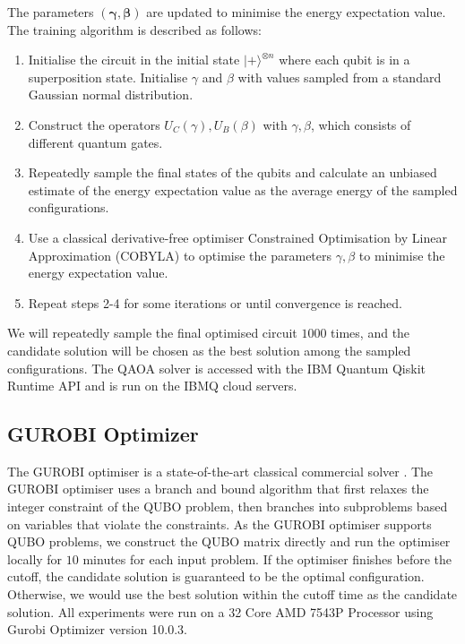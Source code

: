  

The parameters $(\boldsymbol{\gamma}, \boldsymbol{\beta})$ are updated to minimise the energy expectation value. The training algorithm is described as follows:
\begin{enumerate}
    \item Initialise the circuit in the initial state $| + \rangle^{\otimes n}$ where each qubit is in a superposition state. Initialise $\gamma$ and $\beta$ with values sampled from a standard Gaussian normal distribution. 
    \item Construct the operators $U_C(\gamma), U_B(\beta)$ with $\gamma, \beta$, which consists of different quantum gates.
    \item Repeatedly sample the final states of the qubits and calculate an unbiased estimate of the energy expectation value as the average energy of the sampled configurations.
    \item Use a classical derivative-free optimiser Constrained Optimisation by Linear Approximation (COBYLA) to optimise the parameters $\gamma, \beta$ to minimise the energy expectation value.
    \item Repeat steps 2-4 for some iterations or until convergence is reached.
\end{enumerate}
We will repeatedly sample the final optimised circuit $1000$ times, and the candidate solution will be chosen as the best solution among the sampled configurations. The QAOA solver is accessed with the IBM Quantum Qiskit Runtime API and is run on the IBMQ cloud servers.

\subsection{GUROBI Optimizer}
The GUROBI optimiser is a state-of-the-art classical commercial solver \cite{b26}. The GUROBI optimiser uses a branch and bound algorithm that first relaxes the integer constraint of the QUBO problem, then branches into subproblems based on variables that violate the constraints. As the GUROBI optimiser supports QUBO problems, we construct the QUBO matrix directly and run the optimiser locally for $10$ minutes for each input problem. If the optimiser finishes before the cutoff, the candidate solution is guaranteed to be the optimal configuration. Otherwise, we would use the best solution within the cutoff time as the candidate solution.  All experiments were run on a 32 Core AMD 7543P Processor using Gurobi Optimizer version 10.0.3.

